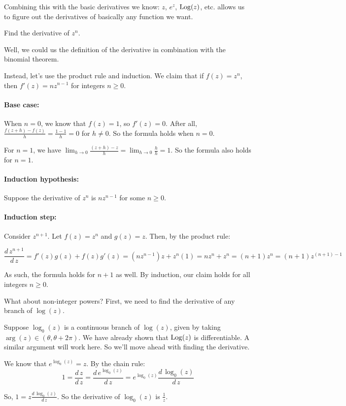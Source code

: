 Combining this with the basic derivatives we know: $z$, $e^z$, $\mathrm{Log}(z)$, etc. allows us to figure out the derivatives of basically any function we want.

\begin{ex}{}{} Find the derivative of $z^n$.

Well, we could us the definition of the derivative in combination with the binomial theorem.

Instead, let's use the product rule and induction. We claim that if $f(z) = z^n$, then $f'(z) = nz^{n-1}$ for integers $n \ge 0$.

\paragraph{Base case:} When $n = 0$, we know that $f(z) = 1$, so $f'(z) = 0$. After all, $\frac{f(z + h) - f(z)}{h} = \frac{1-1}{h} = 0$ for $h\ne 0$. So the formula holds when $n = 0$.

For $n = 1$, we have $\lim_{h\rightarrow 0} \frac{(z+h) - z}{h} = \lim_{h\rightarrow 0} \frac{h}{h} = 1$. So the formula also holds for $n = 1$.

\paragraph{Induction hypothesis:} Suppose the derivative of $z^n$ is $nz^{n-1}$ for some $n\ge 0$.

\paragraph{Induction step:} Consider $z^{n+1}$. Let $f(z) = z^n$ and $g(z) = z$. Then, by the product rule:

$$\frac{d\, z^{n+1}}{d\,z} = f'(z)g(z) + f(z)g'(z) = (nz^{n-1})z + z^n(1) = nz^n + z^n = (n+1)z^n = (n+1)z^{(n+1)-1}$$

As such, the formula holds for $n+1$ as well. By induction, our claim holds for all integers $n\ge 0$.

\end{ex}

What about non-integer powers? First, we need to find the derivative of any branch of $\log(z)$.

\begin{ex}{}{} Suppose $\log_0(z)$ is a continuous branch of $\log(z)$, given by taking $\arg(z) \in (\theta,\theta + 2\pi)$. We have already shown that $\mathrm{Log}(z)$ is differentiable. A similar argument will work here. So we'll move ahead with finding the derivative.

We know that $e^{\log_0(z)} = z$. By the chain rule:
$$1 = \frac{d\,z}{d\,z} = \frac{d \, e^{\log_0(z)}}{d\, z} = e^{\log_0(z)}\frac{d\, \log_0(z)}{d\,z}$$

So, $1 = z\frac{d\,\log_0(z)}{d\,z}$. So the derivative of $\log_0(z)$ is $\frac{1}{z}$.
\end{ex}

